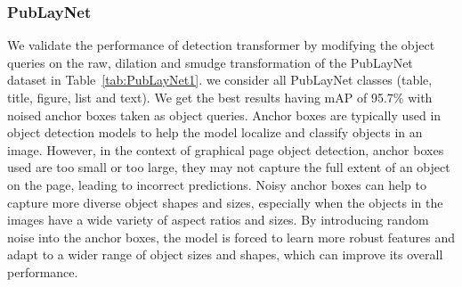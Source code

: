 \documentclass[sn-mathphys]{sn-jnl}\jyear{2021}\theoremstyle{thmstyleone}\newtheorem{theorem}{Theorem}\newtheorem{proposition}[theorem]{Proposition}\theoremstyle{thmstyletwo}\newtheorem{example}{Example}\newtheorem{remark}{Remark}\theoremstyle{thmstylethree}\newtheorem{definition}{Definition}\usepackage{amsmath}
\begin{document}
\subsubsection{PubLayNet}
\label{sec:PubLayNet-result}
We validate the performance of detection transformer by modifying the object queries on the raw, dilation and smudge transformation of the PubLayNet dataset in Table~\ref{tab:PubLayNet1}. we consider all PubLayNet classes (table, title, figure, list and text). We get the best results having mAP of 95.7$\%$  with noised anchor boxes taken as object queries. Anchor boxes are typically used in object detection models to help the model localize and classify objects in an image. However, in the context of graphical page object detection, anchor boxes used are too small or too large, they may not capture the full extent of an object on the page, leading to incorrect predictions. Noisy anchor boxes can help to capture more diverse object shapes and sizes, especially when the objects in the images have a wide variety of aspect ratios and sizes. By introducing random noise into the anchor boxes, the model is forced to learn more robust features and adapt to a wider range of object sizes and shapes, which can improve its overall performance.  \\
\end{document}
